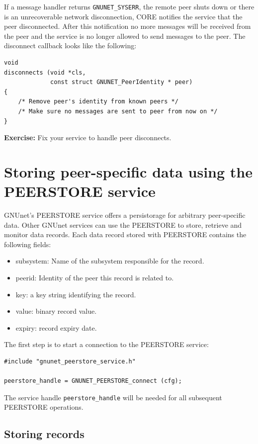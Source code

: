 \documentclass[10pt]{article}
\newcommand{\exercise}[1]{\noindent\begin{boxedminipage}{\textwidth}{\bf Exercise:} #1 \end{boxedminipage}}
\begin{document}
If a message handler returns {\tt GNUNET\_SYSERR}, the remote peer shuts down or
there is an unrecoverable network disconnection, CORE notifies the service that
the peer disconnected. After this notification no more messages will be received
from the peer and the service is no longer allowed to send messages to the peer.
The disconnect callback looks like the following:

\lstset{language=C}
\begin{lstlisting}
void
disconnects (void *cls,
             const struct GNUNET_PeerIdentity * peer)
{
    /* Remove peer's identity from known peers */
    /* Make sure no messages are sent to peer from now on */
}
\end{lstlisting}

\exercise{Fix your service to handle peer disconnects.}

\section{Storing peer-specific data using the PEERSTORE service}

GNUnet's PEERSTORE service offers a persistorage for arbitrary peer-specific data.
Other GNUnet services can use the PEERSTORE to store, retrieve and monitor data records.
Each data record stored with PEERSTORE contains the following fields:

\begin{itemize}
\itemsep0em
  \item subsystem: Name of the subsystem responsible for the record.
  \item peerid: Identity of the peer this record is related to.
  \item key: a key string identifying the record.
  \item value: binary record value.
  \item expiry: record expiry date.
\end{itemize}

The first step is to start a connection to the PEERSTORE service:
\begin{lstlisting}
#include "gnunet_peerstore_service.h"

peerstore_handle = GNUNET_PEERSTORE_connect (cfg);
\end{lstlisting}
The service handle \lstinline|peerstore_handle| will be needed for all subsequent
PEERSTORE operations.

\subsection{Storing records}
\end{document}
